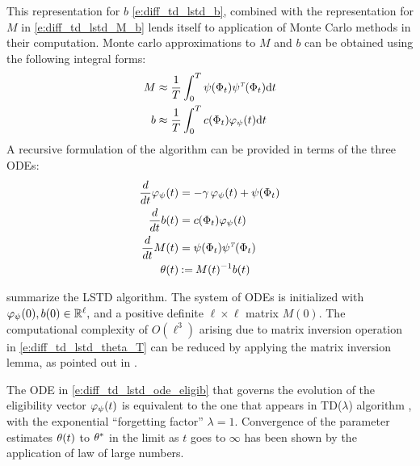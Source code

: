 This representation for $b$ \eqref{e:diff_td_lstd_b}, combined with the representation for $M$ in \eqref{e:diff_td_lstd_M_b} lends itself to application of Monte Carlo methods in their computation. Monte carlo approximations to $M$ and $b$ can be obtained using the following integral forms:
\begin{subequations}
\begin{align}
M &\approx \frac{1}{T} \int_0^T  \basis(\markovstate_t) \basis^\transpose(\markovstate_t) \ud t
\label{e:diff_td_lstd_M_T}
\\
b & \approx  \frac{1}{T} \int_0^T c(\markovstate_t) \eligibvector_\basis(t) \ud t
\label{e:diff_td_lstd_b_T}
\end{align}
\end{subequations}
A recursive formulation of the algorithm can be provided in terms of the three ODEs:
\begin{subequations}
\begin{align}
\ddt \eligibvector_\basis (t) &= - \discount\, \eligibvector_\basis(t) + \basis (\markovstate_t) 
\label{e:diff_td_lstd_ode_eligib} \\
\ddt b(t) &=  c(\markovstate_t)\eligibvector_\basis(t)
 \label{e:diff_td_lstd_ode_b}\\
\ddt M(t) &= \basis(\markovstate_t) \basis^\transpose(\markovstate_t) 
\label{e:diff_td_lstd_ode_M} \\
\param(t) &\eqdef  M(t)^{-1} b(t)
\label{e:diff_td_lstd_theta_T}
\end{align}
\end{subequations}

 summarize the LSTD algorithm. The system of ODEs is initialized with $\varphi_\psi(0), b(0) \in \mathbb{R}^\ell,$ and a positive definite $\ell \times \ell$ matrix $M(0)$. The computational complexity of $O(\ell^3)$ arising due to matrix inversion operation in \eqref{e:diff_td_lstd_theta_T} can be reduced by applying the matrix inversion lemma, as pointed out in \cite{ctcn}. 

The ODE in \eqref{e:diff_td_lstd_ode_eligib} that governs the evolution of the eligibility vector $\varphi_\psi(t)$ is equivalent to the one that appears in TD($\lambda$) algorithm \cite{sut88}, with the exponential ``forgetting factor'' $\lambda = 1$. Convergence of the parameter estimates $\theta(t)$ to $\theta^*$ in the limit as $t$ goes to $\infty$ has been shown by the application of law of large numbers. %


